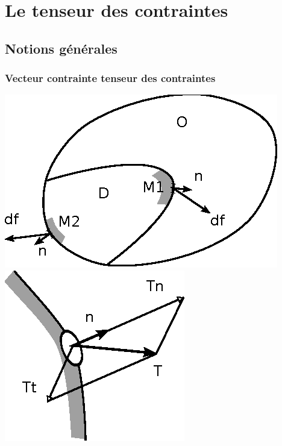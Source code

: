 \chapter{Le tenseur des contraintes} \label{chap:Ch02}
\section{Notions générales} \label{sec:Ch02-1}
\subsection{Vecteur contrainte tenseur des contraintes} \label{ssec:Ch02-1.1}
\begin{multicols}{2}
    \begin{center}
    \includegraphics{../images/T1_Ch02-0001}
    \includegraphics{../images/T1_Ch02-0002}
    \end{center}
\end{multicols}
